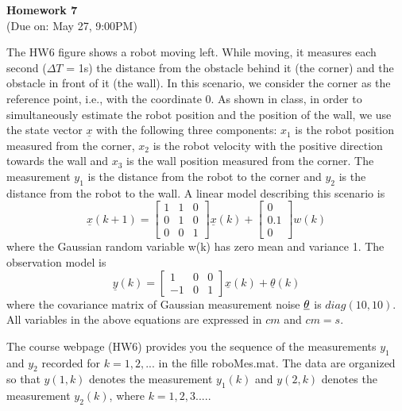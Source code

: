 \documentclass{article}
\begin{document}
 
\begin{center}
{\bf \Large  Homework 7} \\
(Due on: May 27, 9:00PM)
\end{center}

The HW6 figure shows a robot moving left. While moving, it measures each second ($\Delta T$ = 1s) the distance from the obstacle behind it (the corner) and the obstacle
in front of it (the wall). In this scenario, we consider the corner as the reference
point, i.e., with the coordinate 0. As shown in class, in order to simultaneously
estimate the robot position and the position of the wall, we use the state vector
$\underline{x}$ with the following three components: $x_1$ is the robot position measured from
the corner, $x_2$ is the robot velocity with the positive direction towards the wall
and $x_3$ is the wall position measured from the corner. The measurement $y_1$ is
the distance from the robot to the corner and $y_2$ is the distance from the robot
to the wall. A linear model describing this scenario is
\begin{equation}
  \underline{x}(k+1)=\left[ 
  \begin{array}{ccc}
     1 & 1 & 0  \\
     0 & 1 & 0  \\
     0 & 0 & 1 
  \end{array}
   \right] \underline{x}(k)+ \left[
     \begin{array}{c}
     0   \\
     0.1   \\
     0
  \end{array}
   \right] w(k)
\end{equation}
where the Gaussian random variable w(k) has zero mean and variance 1. The
observation model is
\begin{equation}
 \underline{y}(k) =\left[
     \begin{array}{ccc}
     1 & 0 &  0  \\
     -1 & 0 & 1   
  \end{array}
   \right] \underline{x}(k)+\underline{\theta}(k)
\end{equation}
where the covariance matrix of Gaussian measurement noise $\underbar{$\theta$}$ 
is $diag(10, 10)$. All variables in the above equations are expressed in $cm$ and $cm=s$.

The course webpage (HW6) provides you the sequence of the measurements
$y_1$ and $y_2$ recorded for $k = 1, 2,...$ in the fille roboMes.mat. The data are
organized so that $y(1, k)$ denotes the measurement $y_1(k)$ and $y(2, k)$ 
denotes the measurement $y_2(k)$, where $k=1,2,3....$. 
\end{document}
